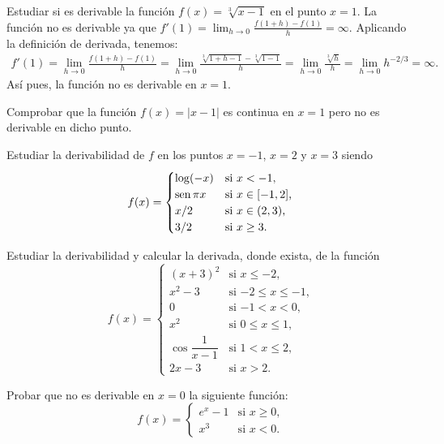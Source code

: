 
{Estudiar si es derivable la función $f(x)=\sqrt[3]{x-1}$ en el punto $x=1$.
}
{La función no es derivable ya que $f'(1)=\lim_{h\rightarrow 0}\frac{f(1+h)-f(1)}{h} = \infty$. 
}
{Aplicando la definición de derivada, tenemos:
\begin{align*}
f'(1) = \lim_{h\rightarrow 0}\frac{f(1+h)-f(1)}{h} = \lim_{h\rightarrow 0}\frac{\sqrt[3]{1+h-1}-\sqrt[3]{1-1}}{h} = \lim_{h\rightarrow 0}\frac{\sqrt[3]{h}}{h} = \lim_{h\rightarrow 0} h^{-2/3} = \infty. 
\end{align*}
Así pues, la función no es derivable en $x=1$.
}


{Comprobar que la función $f(x)=|x-1|$ es continua en $x=1$ pero no es derivable en dicho punto.
}


{Estudiar la derivabilidad de $f$ en los puntos $x=-1$, $x=2$ y $x=3$ siendo
\[ f(x)=
\begin{cases}
\log(-x) & \mbox{si $x<-1$,} \\
\operatorname{sen} \pi x & \mbox{si $x\in [-1,2]$,} \\
x/2 & \mbox{si $x\in (2,3)$,} \\
3/2 & \mbox{si $x\geq 3$.}
\end{cases}
\]
}


{Estudiar la derivabilidad y calcular la derivada, donde exista, de la función
\[ f(x)=
\begin{cases}
(x+3)^2 & \mbox{si $x\leq -2$,} \\
x^2-3 & \mbox{si $-2\leq x\leq -1$,} \\
0 & \mbox{si $-1< x <0$,} \\
x^2 & \mbox{si $0\leq x \leq 1$,} \\
\cos \dfrac{1}{x-1} & \mbox{si $1< x\leq 2$,} \\
2x-3 & \mbox{si $x>2$.}
\end{cases}
\]
}


{Probar que no es derivable en $x=0$ la siguiente función:
\[ f(x)=
\begin{cases}
e^x-1 & \mbox{si $x\geq 0$,}  \\
x^3 & \mbox{si $x<0$.}
\end{cases}
\]
}


